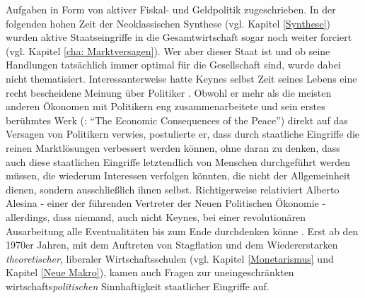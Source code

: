 Aufgaben in Form von aktiver Fiskal- und Geldpolitik zugeschrieben. In der folgenden hohen Zeit der Neoklassischen Synthese (vgl. Kapitel \ref{Synthese}) wurden aktive Staatseingriffe in die Gesamtwirtschaft sogar noch weiter forciert (vgl. Kapitel \ref{cha: Marktversagen}). Wer aber dieser Staat ist und ob seine Handlungen tatsächlich immer optimal für die Gesellschaft sind, wurde dabei nicht thematisiert. Interessanterweise hatte Keynes selbst Zeit seines Lebens eine recht bescheidene Meinung über Politiker \parencite[S. 519]{Snowdon2005}. Obwohl er mehr als die meisten anderen Ökonomen mit Politikern eng zusammenarbeitete und sein erstes berühmtes Werk (\textcite{Keynes1919}: "`The Economic Consequences of the Peace"') direkt auf das Versagen von Politikern verwies, postulierte er, dass durch staatliche Eingriffe die reinen Marktlösungen verbessert werden können, ohne daran zu denken, dass auch diese staatlichen Eingriffe letztendlich von Menschen durchgeführt werden müssen, die wiederum Interessen verfolgen könnten, die nicht der Allgemeinheit dienen, sondern ausschließlich ihnen selbst. Richtigerweise relativiert Alberto Alesina - einer der führenden Vertreter der Neuen Politischen Ökonomie - allerdings, dass niemand, auch nicht Keynes, bei einer revolutionären Ausarbeitung alle Eventualitäten bis zum Ende durchdenken könne \parencite[S. 569]{Snowdon2005}. Erst ab den 1970er Jahren, mit dem Auftreten von Stagflation und dem Wiedererstarken \textit{theoretischer}, liberaler Wirtschaftsschulen (vgl. Kapitel \ref{Monetarismus} und Kapitel \ref{Neue Makro}), kamen auch Fragen zur uneingeschränkten wirtschafts\textit{politischen} Sinnhaftigkeit staatlicher Eingriffe auf. 


